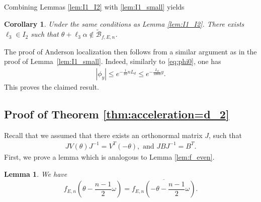 \documentclass[11pt]{amsart}
\newtheorem{lemma}[theorem]{Lemma}
\newtheorem{corollary}[theorem]{Corollary}
\begin{document}
Combining Lemmas \ref{lem:I1_I2} with \ref{lem:I1_small} yields
\begin{corollary}\label{cor:I2_large}
Under the same conditions as Lemma \ref{lem:I1_I2}.
There exists $\ell_3\in I_2$ such that $\theta+\ell_3\alpha\notin \widetilde{\mathcal{B}}_{f,E,n}$.
\end{corollary}
The proof of Anderson localization then follows from a similar argument as in the proof of Lemma~\ref{lem:I1_small}.
Indeed, similarly to \eqref{eq:phi0}, one has
\begin{align}\label{eq:phiy}
|\phi_y|\leq e^{-\frac{1}{10}nL_d}\leq e^{-\frac{L_d}{100d}y}.
\end{align}
This proves the claimed result.



\subsection{Proof of Theorem \ref{thm:acceleration=d_2}}
Recall that we assumed that there exists an orthonormal matrix $J$, such that 
\begin{align}\label{eq:JVJ=Vt_JBJ=Bt}
JV(\theta)J^{-1}=V^T(-\theta), \text{ and } JBJ^{-1}=B^T.
\end{align}
First, we prove a lemma which is analogous to Lemma \ref{lem:f_even}.
\begin{lemma}\label{lem:f_even2}
We have
\[f_{E,n}(\theta-\frac{n-1}{2}\omega)=\overline{f_{E,n}(-\theta-\frac{n-1}{2}\omega)}.\]
\end{lemma}
\end{document}
